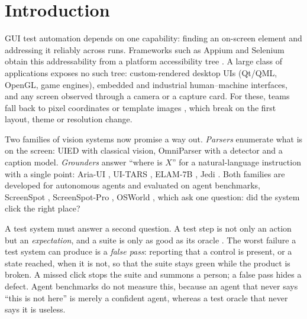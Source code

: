 \documentclass[conference]{IEEEtran}
\begin{document}
\section{Introduction}
GUI test automation depends on one capability: finding an on-screen element and addressing it reliably across runs. Frameworks such as Appium and Selenium obtain this addressability from a platform accessibility tree \cite{uiautomator,appium}. A large class of applications exposes no such tree: custom-rendered desktop UIs (Qt/QML, OpenGL, game engines), embedded and industrial human--machine interfaces, and any screen observed through a camera or a capture card. For these, teams fall back to pixel coordinates or template images \cite{yeh2009sikuli}, which break on the first layout, theme or resolution change.

Two families of vision systems now promise a way out. \emph{Parsers} enumerate what is on the screen: UIED \cite{xie2020uied} with classical vision, OmniParser \cite{omniparser2024} with a detector and a caption model. \emph{Grounders} answer ``where is $X$'' for a natural-language instruction with a single point: Aria-UI \cite{ariaui2024}, UI-TARS \cite{uitars2025}, ELAM-7B \cite{elam7b}, Jedi \cite{jedi2025}. Both families are developed for autonomous agents and evaluated on agent benchmarks, ScreenSpot \cite{seeclick2024}, ScreenSpot-Pro \cite{screenspotpro2025}, OSWorld \cite{osworld2024}, which ask one question: did the system click the right place?

A test system must answer a second question. A test step is not only an action but an \emph{expectation}, and a suite is only as good as its oracle \cite{barr2015oracle}. The worst failure a test system can produce is a \emph{false pass}: reporting that a control is present, or a state reached, when it is not, so that the suite stays green while the product is broken. A missed click stops the suite and summons a person; a false pass hides a defect. Agent benchmarks do not measure this, because an agent that never says ``this is not here'' is merely a confident agent, whereas a test oracle that never says it is useless.
\end{document}
